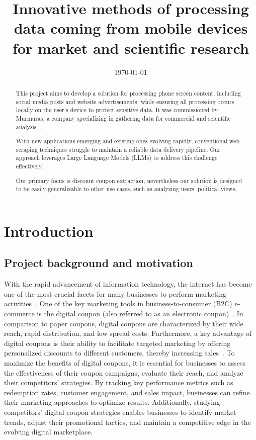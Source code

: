 \documentclass[licencjacka,en]{docs/pracamgr}
\title{Innovative methods of processing data coming from mobile devices for market and scientific research}
\date{\today}
\begin{document}
\maketitle

\begin{abstract}
    This project aims to develop a solution for processing phone screen content, including social media posts and website advertisements, while ensuring all processing occurs locally on the user's device to protect sensitive data. It was commissioned by Murmuras, a company specializing in gathering data for commercial and scientific analysis~\cite{murmuras}.
    
    With new applications emerging and existing ones evolving rapidly, conventional web scraping techniques struggle to maintain a reliable data delivery pipeline. Our approach leverages Large Language Models (LLMs) to address this challenge effectively.

    Our primary focus is discount coupon extraction, nevertheless our solution is designed to be easily generalizable to other use cases, such as analyzing users' political views.
\end{abstract}

\tableofcontents

\chapter{Introduction}
\section{Project background and motivation}
With the rapid advancement of information technology, the internet has become one of the most crucial facets for many businesses to perform marketing activities~\cite{design_of_coupons}. One of the key marketing tools in business-to-consumer (B2C) e-commerce is the digital coupon (also referred to as an electronic coupon)~\cite{targeted_reminders}. In comparison to paper coupons, digital coupons are characterized by their wide reach, rapid distribution, and low spread costs. Furthermore, a key advantage of digital coupons is their ability to facilitate targeted marketing by offering personalized discounts to different customers, thereby increasing sales~\cite{design_of_coupons}. To maximize the benefits of digital coupons, it is essential for businesses to assess the effectiveness of their coupon campaigns, evaluate their reach, and analyze their competitors’ strategies. By tracking key performance metrics such as redemption rates, customer engagement, and sales impact, businesses can refine their marketing approaches to optimize results. Additionally, studying competitors' digital coupon strategies enables businesses to identify market trends, adjust their promotional tactics, and maintain a competitive edge in the evolving digital marketplace.
\end{document}
